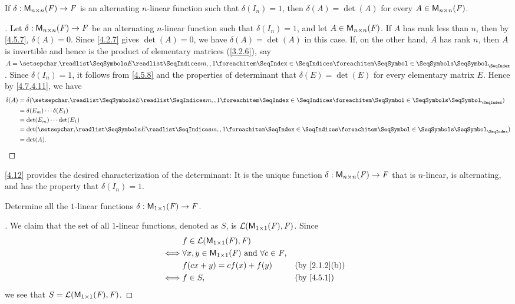 \begin{thm}\label{4.12}
	If \(\delta : \ms[n][n][\F] \to \F\) is an alternating \(n\)-linear function such that \(\delta(I_n) = 1\), then \(\delta(A) = \det(A)\) for every \(A \in \ms[n][n][\F]\).
\end{thm}

\begin{proof}[]
	Let \(\delta : \ms[n][n][\F] \to \F\) be an alternating \(n\)-linear function such that \(\delta(I_n) = 1\), and let \(A \in \ms[n][n][\F]\).
	If \(A\) has rank less than \(n\), then by \cref{4.5.7}, \(\delta(A) = 0\).
	Since \cref{4.2.7} gives \(\det(A) = 0\), we have \(\delta(A) = \det(A)\) in this case.
	If, on the other hand, \(A\) has rank \(n\), then \(A\) is invertible and hence is the product of elementary matrices (\cref{3.2.6}), say \(A = \seq[]{E}{m,,1}\).
	Since \(\delta(I_n) = 1\), it follows from \cref{4.5.8} and the properties of determinant that \(\delta(E) = \det(E)\) for every elementary matrix \(E\).
	Hence by \cref{4.7,4.11}, we have
	\begin{align*}
		\delta(A) & = \delta(\seq[]{E}{m,,1})        \\
		          & = \delta(E_m) \cdots \delta(E_1) \\
		          & = \det(E_m) \cdots \det(E_1)     \\
		          & = \det(\seq[]{E}{m,,1})          \\
		          & = \det(A).
	\end{align*}
\end{proof}

\begin{note}
	\cref{4.12} provides the desired characterization of the determinant:
	It is the unique function \(\delta : \ms[n][n][\F] \to \F\) that is \(n\)-linear, is alternating, and has the property that \(\delta(I_n) = 1\).
\end{note}

\exercisesection

\setcounter{ex}{1}
\begin{ex}\label{ex:4.5.2}
	Determine all the \(1\)-linear functions \(\delta : \ms[1][1][\F] \to \F\).
\end{ex}

\begin{proof}[]
	We claim that the set of all \(1\)-linear functions, denoted as \(S\), is \(\ls(\ms[1][1][\F], \F)\).
	Since
	\begin{align*}
		     & f \in \ls(\ms[1][1][\F], \F)                                                     \\
		\iff & \forall x, y \in \ms[1][1][\F] \text{ and } \forall c \in \F,                    \\
		     & f(cx + y) = cf(x) + f(y)                                      &  & \by{2.1.2}[b] \\
		\iff & f \in S,                                                      &  & \by{4.5.1}
	\end{align*}
	we see that \(S = \ls(\ms[1][1][\F], \F)\).
\end{proof}

